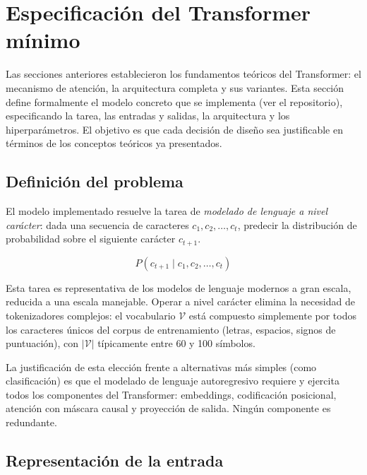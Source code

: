 \section{Especificación del Transformer mínimo}
\label{sec:transformer_minimo}

Las secciones anteriores establecieron los fundamentos teóricos del
Transformer: el mecanismo de atención, la arquitectura completa y sus
variantes. Esta sección define formalmente el modelo concreto que se
implementa (ver el repositorio), especificando la tarea,
las entradas y salidas, la arquitectura y los hiperparámetros. El objetivo
es que cada decisión de diseño sea justificable en términos de los
conceptos teóricos ya presentados.

\subsection{Definición del problema}
\label{subsec:def_problema}

El modelo implementado resuelve la tarea de \textit{modelado de lenguaje
a nivel carácter}: dada una secuencia de caracteres $c_1, c_2, \ldots,
c_t$, predecir la distribución de probabilidad sobre el siguiente carácter
$c_{t+1}$.

\begin{equation}
    P(c_{t+1} \mid c_1, c_2, \ldots, c_t)
\end{equation}

Esta tarea es representativa de los modelos de lenguaje modernos a gran
escala, reducida a una escala manejable. Operar a nivel carácter elimina
la necesidad de tokenizadores complejos: el vocabulario $\mathcal{V}$
está compuesto simplemente por todos los caracteres únicos del corpus de
entrenamiento (letras, espacios, signos de puntuación), con
$|\mathcal{V}|$ típicamente entre 60 y 100 símbolos.

La justificación de esta elección frente a alternativas más simples
(como clasificación) es que el modelado de lenguaje autoregresivo
requiere y ejercita todos los componentes del Transformer: embeddings,
codificación posicional, atención con máscara causal y proyección de
salida. Ningún componente es redundante.

\subsection{Representación de la entrada}
\label{subsec:entrada}

